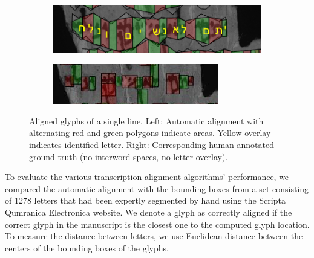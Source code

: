 \begin{figure}[t] \centering\ \begin{subfigure}{0.48\textwidth}
\includegraphics[width=1.0\linewidth]{images/P1094-Fg002-R-line02.PNG}
\label{fig:alignedChars} \end{subfigure} \begin{subfigure}{0.48\textwidth}
	\includegraphics[width=1.0\linewidth]{images/P1094-Fg002-R-line02GT.PNG}
\label{fig:alignedCharsGT} \end{subfigure} \vspace*{-5mm} \caption{Aligned
glyphs of a single line. Left: Automatic alignment with alternating red and
green polygons indicate areas. Yellow overlay indicates identified letter.
Right: Corresponding human annotated ground truth (no interword spaces, no
letter overlay).} \vspace*{-5mm} \label{fig:alignedGlyphs} \end{figure}

%


To evaluate the various transcription alignment algorithms' performance, we
compared the automatic alignment with the bounding boxes from a set consisting
of 1278 letters that had been expertly segmented by hand using the Scripta
Qumranica Electronica website.  We denote a glyph as correctly aligned if the
correct glyph in the manuscript is the closest one to the computed glyph
location.  To measure the distance between letters, we use Euclidean distance
between the centers of the bounding boxes of the glyphs.

